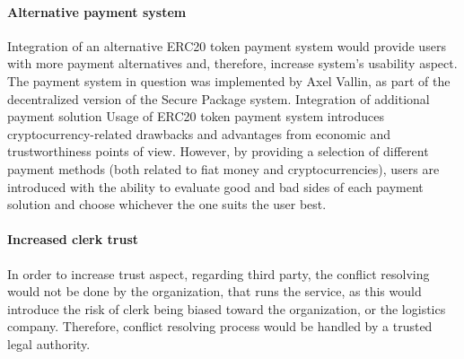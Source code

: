 \paragraph{Alternative payment system}
Integration of an alternative ERC20 token payment system would provide users with more payment alternatives and, therefore, increase system's usability aspect. The payment system in question was implemented by Axel Vallin, as part of the decentralized version of the Secure Package system. Integration of additional payment solution Usage of ERC20 token payment system introduces cryptocurrency-related drawbacks and advantages from economic and trustworthiness points of view. However, by providing a selection of different payment methods (both related to fiat money and cryptocurrencies), users are introduced with the ability to evaluate good and bad sides of each payment solution and choose whichever the one suits the user best.

\paragraph{Increased clerk trust}
In order to increase trust aspect, regarding third party, the conflict resolving would not be done by the organization, that runs the service, as this would introduce the risk of clerk being biased toward the organization, or the logistics company. Therefore, conflict resolving process would be handled by a trusted legal authority.